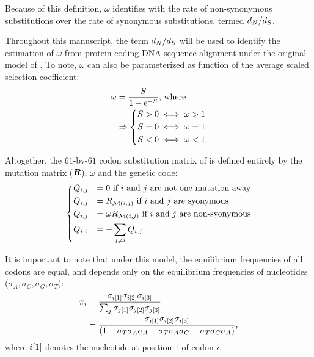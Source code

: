 Because of this definition, $\omega$ identifies with the rate of non-synonymous substitutions over the rate of synonymous substitutions, termed $d_N / d_S$.

Throughout this manuscript, the term $d_N / d_S$ will be used to identify the estimation of $\omega$ from protein coding DNA sequence alignment under the original model of \citet{Muse1994}.
To note, $\omega$ can also be parameterized as function of the average scaled selection coefficient:
\begin{align}
\omega & = \dfrac{S}{1 - \mathrm{e}^{-S}} \text{, where }\\
& \Rightarrow	\begin{dcases}
	S > 0 \iff \omega > 1 \\
	S = 0 \iff \omega = 1 \\
	S < 0 \iff \omega < 1
	\end{dcases}
\end{align}

Altogether, the $61$-by-$61$ codon substitution matrix of \citet{Muse1994} is defined entirely by the mutation matrix ($\bm{R}$), $\omega$ and the genetic code:
\begin{equation}
\begin{dcases}
Q_{{i}, {j}} & = 0 \text{ if ${i}$ and ${j}$ are not one mutation away} \\
Q_{{i}, {j}} & = R_{\mathcal{M}({i}, {j})} \text{ if ${i}$ and ${j}$ are syonymous} \\
Q_{{i}, {j}} & = \omega R_{\mathcal{M}({i}, {j})} \text{ if ${i}$ and ${j}$ are non-syonymous} \\
Q_{{i}, {i}} & = - \sum_{{j} \neq {i}} Q_{{i}, {j}}
\end{dcases}
\label{eq:codon-models}
\end{equation}

It is important to note that under this model, the equilibrium frequencies of all codons are equal, and depends only on the equilibrium frequencies of nucleotides ($\sigma_{A}, \sigma_{C}, \sigma_{G}, \sigma_{T}$):
\begin{align}
\pi_{{i}} & = \dfrac{\sigma_{{i}[1]}\sigma_{{i}[2]}\sigma_{{i}[3]}}{\sum_{{j}}\sigma_{{j}[1]}\sigma_{{j}[2]}\sigma_{{j}[3]} } \\
 & = \dfrac{\sigma_{{i}[1]}\sigma_{{i}[2]}\sigma_{{i}[3]}}{(1 - \sigma_{T}\sigma_{A}\sigma_{A} - \sigma_{T}\sigma_{A}\sigma_{G} - \sigma_{T}\sigma_{G}\sigma_{A} )},
\end{align}
where ${i}[1]$ denotes the nucleotide at position $1$ of codon $i$.

